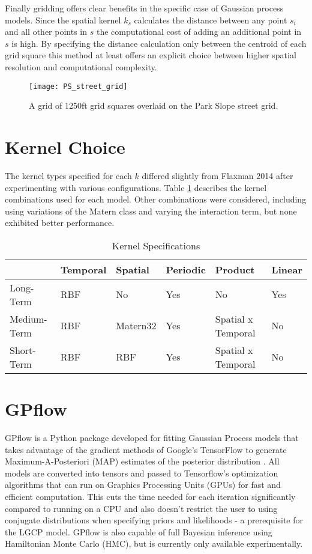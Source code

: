 Finally gridding offers clear benefits in the specific case of Gaussian process models. Since the spatial kernel $k_s$ calculates the distance between any point $s_i$ and all other points in $s$ the computational cost of adding an additional point in $s$ is high. By specifying the distance calculation only between the centroid of each grid square this method at least offers an explicit choice between higher spatial resolution and computational complexity.


\begin{figure}[h!]
  \centering
  \caption{A grid of 1250ft grid squares overlaid on the Park Slope street grid.}
  \texttt{[image: PS\_street\_grid]}
\end{figure}

\section{Kernel Choice}

The kernel types specified for each $k$ differed slightly from Flaxman 2014 after experimenting with various configurations. Table \ref{kernel_summary} describes the kernel combinations used for each model. Other combinations were considered, including using variations of the Matern class and varying the interaction term, but none exhibited better performance.


\begin{table}[]
\centering
\caption{Kernel Specifications}
\label{kernel_summary}
\begin{tabular}{@{}llllll@{}}
\toprule
            & Temporal & Spatial  & Periodic & Product            & Linear \\ \midrule
Long-Term   & RBF      & No       & Yes      & No                 & Yes    \\
Medium-Term & RBF      & Matern32 & Yes      & Spatial x Temporal & No     \\
Short-Term  & RBF      & RBF      & Yes      & Spatial x Temporal & No     \\ \bottomrule
\end{tabular}
\end{table}


\section{GPflow}

GPflow is a Python package developed for fitting Gaussian Process models that takes advantage of the gradient methods of Google's TensorFlow to generate Maximum-A-Posteriori (MAP) estimates of the posterior distribution \cite{GPflow2017} \cite{tensorflow2015-whitepaper}. All models are converted into tensors and passed to Tensorflow's optimization algorithms that can run on Graphics Processing Units (GPUs) for fast and efficient computation. This cuts the time needed for each iteration significantly compared to running on a CPU and also doesn't restrict the user to using conjugate distributions when specifying priors and likelihoods - a prerequisite for the LGCP model. GPflow is also capable of full Bayesian inference using Hamiltonian Monte Carlo (HMC), but is currently only available experimentally.

